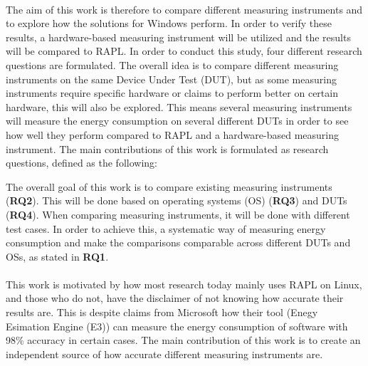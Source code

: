 \paragraph*{}
The aim of this work is therefore to compare different measuring instruments and to explore how the solutions for Windows perform. In order to verify these results, a hardware-based measuring instrument will be utilized and the results will be compared to RAPL. In order to conduct this study, four different research questions are formulated. The overall idea is to compare different measuring instruments on the same Device Under Test (DUT), but as some measuring instruments require specific hardware or claims to perform better on certain hardware, this will also be explored. This means several measuring instruments will measure the energy consumption on several different DUTs in order to see how well they perform compared to RAPL and a hardware-based measuring instrument. The main contributions of this work is formulated as research questions, defined as the following:



The overall goal of this work is to compare existing measuring instruments (\textbf{RQ2}). This will be done based on operating systems (OS) (\textbf{RQ3}) and DUTs (\textbf{RQ4}). When comparing measuring instruments, it will be done with different test cases. In order to achieve this, a systematic way of measuring energy consumption and make the comparisons comparable across different DUTs and OSs, as stated in \textbf{RQ1}.

\paragraph*{}
This work is motivated by how most research today mainly uses RAPL on Linux\cite[]{Rasmussen2021,Pereira2017,Theilmann2022,Lindholt2022}, and those who do not, have the disclaimer of not knowing how accurate their results are\cite[]{Bruce2015ReducingEC, Ozturk2019, Unlu2021}. This is despite claims from Microsoft how their tool (Enegy Esimation Engine (E3)) can measure the energy consumption of software with 98\% accuracy in certain cases\cite[]{E3WinHec}. The main contribution of this work is to create an independent source of how accurate different measuring instruments are.

